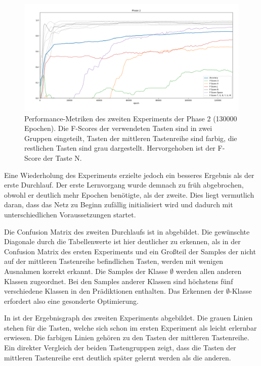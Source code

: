 \begin{figure}
    \centering
    \includegraphics[width=\textwidth]{../common/images/phase2.png}
    \caption[Performance-Metriken des zweiten Experiments der Phase 2]{Performance-Metriken des zweiten Experiments der Phase 2 (\num{130000} Epochen). Die F-Scores der verwendeten Tasten sind in zwei Gruppen eingeteilt, Tasten der mittleren Tastenreihe sind farbig, die restlichen Tasten sind grau dargestellt. Hervorgehoben ist der F-Score der Taste N.}
\end{figure}

Eine Wiederholung des Experiments erzielte jedoch ein besseres Ergebnis als der erste Durchlauf. Der erste Lernvorgang wurde demnach zu früh abgebrochen, obwohl er deutlich mehr Epochen benötigte, als der zweite. Dies liegt vermutlich daran, dass das Netz zu Beginn zufällig initialisiert wird und dadurch mit unterschiedlichen Voraussetzungen startet.

Die Confusion Matrix des zweiten Durchlaufs ist in  abgebildet. Die gewünschte Diagonale durch die Tabellenwerte ist hier deutlicher zu erkennen, als in der Confusion Matrix des ersten Experiments und ein Großteil der Samples der nicht auf der mittleren Tastenreihe befindlichen Tasten, werden mit wenigen Ausnahmen korrekt erkannt. Die Samples der Klasse $\emptyset$ werden allen anderen Klassen zugeordnet. Bei den Samples anderer Klassen sind höchstens fünf verschiedene Klassen in den Prädiktionen enthalten.
Das Erkennen der $\emptyset$-Klasse erfordert also eine gesonderte Optimierung.

In  ist der Ergebnisgraph des zweiten Experiments abgebildet.
Die grauen Linien stehen für die Tasten, welche sich schon im ersten Experiment als leicht erlernbar erwiesen. Die farbigen Linien gehören zu den Tasten der mittleren Tastenreihe. Ein direkter Vergleich der beiden Tastengruppen zeigt, dass die Tasten der mittleren Tastenreihe erst deutlich später gelernt werden als die anderen.

